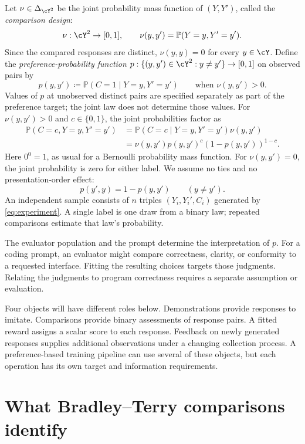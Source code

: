 \documentclass[11pt,twoside]{article}
\renewcommand{\P}{\mathbb P}
\theoremstyle{definition}
\theoremstyle{remark}
\begin{document}
Let $\nu\in\Delta_{\cY^2}$ be the joint probability mass function of
$(Y,Y')$, called the \emph{comparison design}:
\[
 \nu:\cY^2\to[0,1],\qquad
 \nu(y,y')=\P(Y=y,Y'=y').
\]
Since the compared responses are distinct, $\nu(y,y)=0$ for every
$y\in\cY$. Define the \emph{preference-probability function}
$p:\{(y,y')\in\cY^2:y\ne y'\}\to[0,1]$ on observed pairs by
\[
 p(y,y')\coloneqq\P(C=1\mid Y=y,Y'=y')\qquad\text{when }\nu(y,y')>0.
\]
Values of $p$ at unobserved distinct pairs are specified separately as part
of the preference target; the joint law does not determine those values.
For $\nu(y,y')>0$ and $c\in\{0,1\}$, the joint probabilities factor as
\begin{equation}
 \begin{aligned}
 \P(C=c,Y=y,Y'=y')
 &=\P(C=c\mid Y=y,Y'=y')\nu(y,y')\\
 &=\nu(y,y')p(y,y')^c(1-p(y,y'))^{1-c}.
 \end{aligned}
 \label{eq:experiment}
\end{equation}
Here $0^0=1$, as usual for a Bernoulli probability mass function.
For $\nu(y,y')=0$, the joint probability is zero for either label.
We assume no ties and no presentation-order effect:
\begin{equation}
 p(y',y)=1-p(y,y')\qquad(y\ne y').
 \label{eq:reversal}
\end{equation}
An independent sample consists of $n$ triples $(Y_i,Y_i',C_i)$ generated
by \cref{eq:experiment}. A single label is one draw from a binary law;
repeated comparisons estimate that law's probability.

The evaluator population and the prompt determine the interpretation of
$p$. For a coding prompt, an evaluator might compare correctness, clarity,
or conformity to a requested interface. Fitting the resulting choices targets
those judgments. Relating the judgments to program correctness requires a
separate assumption or evaluation.

Four objects will have different roles below. Demonstrations provide responses
to imitate. Comparisons provide binary assessments of response pairs. A fitted
reward assigns a scalar score to each response. Feedback on newly generated
responses supplies additional observations under a changing collection
process. A preference-based training pipeline can use several of these
objects, but each operation has its own target and information requirements.

\section{What Bradley--Terry comparisons identify}
\label{sec:identification}
\end{document}
